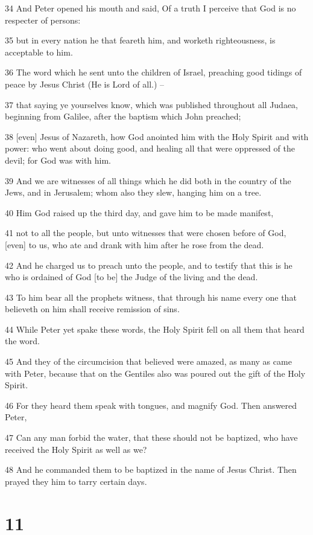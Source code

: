\par 34 And Peter opened his mouth and said, Of a truth I perceive that God is no respecter of persons:
\par 35 but in every nation he that feareth him, and worketh righteousness, is acceptable to him.
\par 36 The word which he sent unto the children of Israel, preaching good tidings of peace by Jesus Christ (He is Lord of all.) --
\par 37 that saying ye yourselves know, which was published throughout all Judaea, beginning from Galilee, after the baptism which John preached;
\par 38 [even] Jesus of Nazareth, how God anointed him with the Holy Spirit and with power: who went about doing good, and healing all that were oppressed of the devil; for God was with him.
\par 39 And we are witnesses of all things which he did both in the country of the Jews, and in Jerusalem; whom also they slew, hanging him on a tree.
\par 40 Him God raised up the third day, and gave him to be made manifest,
\par 41 not to all the people, but unto witnesses that were chosen before of God, [even] to us, who ate and drank with him after he rose from the dead.
\par 42 And he charged us to preach unto the people, and to testify that this is he who is ordained of God [to be] the Judge of the living and the dead.
\par 43 To him bear all the prophets witness, that through his name every one that believeth on him shall receive remission of sins.
\par 44 While Peter yet spake these words, the Holy Spirit fell on all them that heard the word.
\par 45 And they of the circumcision that believed were amazed, as many as came with Peter, because that on the Gentiles also was poured out the gift of the Holy Spirit.
\par 46 For they heard them speak with tongues, and magnify God. Then answered Peter,
\par 47 Can any man forbid the water, that these should not be baptized, who have received the Holy Spirit as well as we?
\par 48 And he commanded them to be baptized in the name of Jesus Christ. Then prayed they him to tarry certain days.

\chapter{11}

